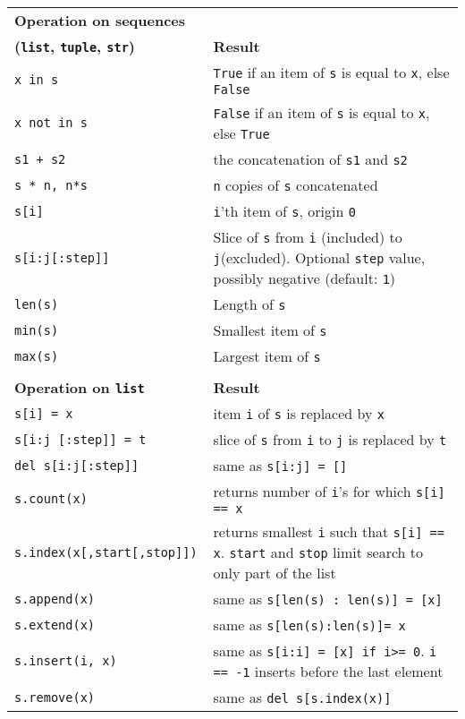 \begin{longtable}{|p{5cm}|p{10cm}|}
\hline
\bf Operation on sequences \label{tab:sequences} &\\
\bf ({\tt list}, {\tt tuple}, {\tt str}) &	\bf Result \\
\hline
\hline
\tt x in s 		& {\tt True} if an item of {\tt s} is equal to {\tt x}, else {\tt False} \\	
\tt x not in s 		& {\tt False} if an item of {\tt s} is equal to {\tt x}, else {\tt True} \\	
\hline
\tt s1 + s2 		& the concatenation of {\tt s1} and {\tt s2} \\	 
\tt s * n, n*s 		& {\tt n} copies of {\tt s} concatenated \\	
\hline
\tt s[i] 		& {\tt i}'th item of {\tt s}, origin {\tt 0} \\	
\tt s[i:j[:step]]	& Slice of {\tt s} from {\tt i} (included) to {\tt j}(excluded). 
		  	  Optional {\tt step} value, possibly negative (default: {\tt 1}) \\ 	
\hline
\tt len(s) 		& Length of {\tt s} \\ 
\tt min(s) 		& Smallest item of {\tt s} \\
\tt max(s) 		& Largest item of {\tt s} \\
\hline
\multicolumn{2}{l}{}\\
\hline
\bf Operation on {\tt list}	\label{tab:listes} &	\bf Result \\
\hline
\hline
\tt s[i] = x 			& item {\tt i} of {\tt s} is replaced by {\tt x} 	\\
\tt s[i:j [:step]] = t 		& slice of {\tt s} from {\tt i} to {\tt j} is replaced by {\tt t} \\	 
\tt del s[i:j[:step]] 		& same as {\tt s[i:j] = []} \\	 
\hline
\tt s.count(x) 			& returns number of {\tt i}'s for which {\tt s[i] == x} \\	 
\tt s.index(x[,start[,stop]]) 	& returns smallest {\tt i} such that {\tt s[i] == x}. 
				  {\tt start} and {\tt stop} limit search to only part 
				  of the list \\ 	
\hline
\tt s.append(x) 		& same as {\tt s[len(s) : len(s)] = [x]} \\	 
\tt s.extend(x) 		& same as {\tt s[len(s):len(s)]= x} \\	
\tt s.insert(i, x) 		& same as {\tt s[i:i] = [x] if i>= 0}. {\tt i == -1} inserts before the last element\\ 	 
\tt s.remove(x) 		& same as {\tt del s[s.index(x)]} \\

\end{longtable}
